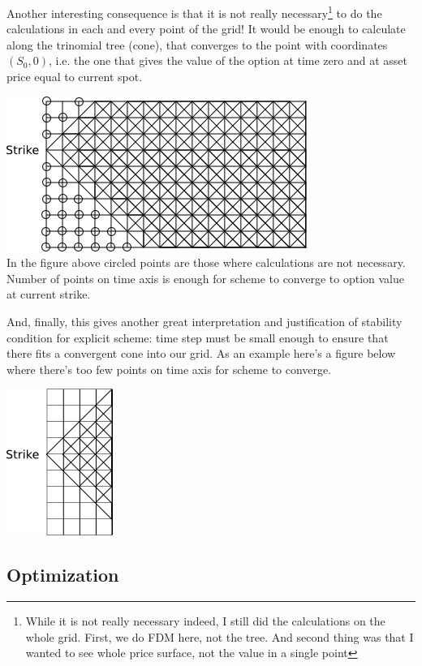 \documentclass[11pt]{article} %
\begin{document}
Another interesting consequence is that it is not really necessary\footnote{While it is not really necessary indeed, I still did the calculations on the whole grid. First, we do FDM here, not the tree. And second thing was that I wanted to see whole price surface, not the value in a single point} to do the calculations in each and every point of the grid! It would be enough to calculate along the trinomial tree (cone), that converges to the point with coordinates $(S_0, 0)$, i.e. the one that gives the value of the option at time zero and at asset price equal to current spot.

\includegraphics[scale=0.5]{convergent-tree.png}\\
In the figure above circled points are those where calculations are not necessary. Number of points on time axis is enough for scheme to converge to option value at current strike. 

And, finally, this gives another great interpretation and justification of stability condition for explicit scheme: time step must be small enough to ensure that there fits a convergent cone into our grid. As an example here's a figure below where there's too few points on time axis for scheme to converge.

\includegraphics[scale=0.5]{non-convergent-tree.png}\\

\subsection{Optimization}
\end{document}
